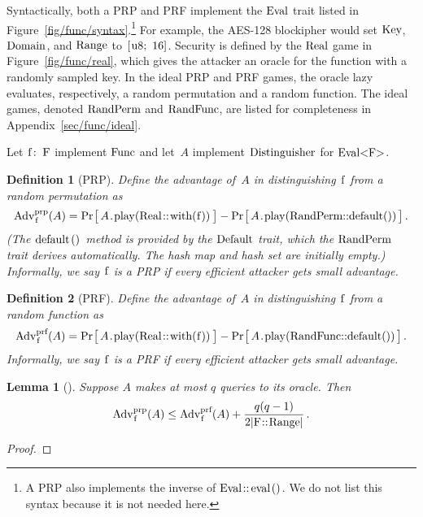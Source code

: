 \documentclass{article}
\newtheorem{definition}{Definition}
\newtheorem{lemma}{Lemma}
\newcommand{\Adv}[1]{\textrm{\textup{Adv}}^{\textup{#1}}}
\newcommand{\Prob}[1]{\Pr\hspace{-1pt}\big[\,#1\,\big]}
\newcommand{\code}[1]{\textrm{\textup{\lstinline{#1}}}}
\begin{document}
Syntactically, both a PRP and PRF implement the $\code{Eval}$ trait listed in
Figure~\ref{fig/func/syntax}.\footnote{A PRP also implements the inverse of
$\code{Eval::eval()}$. We do not list this syntax because it is not needed
here.}
%
For example, the AES-128 blockipher would set $\code{Key}$, $\code{Domain}$,
and $\code{Range}$ to $\code{[u8; 16]}$.
%
Security is defined by the $\code{Real}$ game in Figure~\ref{fig/func/real},
which gives the attacker an oracle for the function with a randomly sampled
key. In the ideal PRP and PRF games, the oracle lazy evaluates, respectively, a
random permutation and a random function.
%
The ideal games, denoted $\code{RandPerm}$ and $\code{RandFunc}$, are listed
for completeness in Appendix~\ref{sec/func/ideal}.

Let $\code{f: F}$ implement \hyperref[fig/func/syntax]{$\code{Func}$} and
let~$A$ implement \hyperref[sec/traits]{$\code{Distinguisher}$} for
\hyperref[sec/traits]{$\code{Eval<F>}$}.

\begin{definition}[PRP]
  Define the advantage of~$A$ in distinguishing $\code{f}$ from a random
  permutation as
  \[
    \Adv{prp}_\code{f}(A) =
      \Prob{A\code{.play(Real::with(f))}} -
      \Prob{A\code{.play(RandPerm::default())}} \,.
  \]
  (The $\code{default()}$ method is provided by the
  \href{https://doc.rust-lang.org/std/default/trait.Default.html}{$\code{Default}$}
  trait, which the \hyperref[sec/traits]{$\code{RandPerm}$} trait derives automatically.
  The hash map and hash set are initially empty.)
  Informally, we say $\code{f}$ is a PRP if every efficient attacker gets small
  advantage.
\end{definition}

\begin{definition}[PRF]
  Define the advantage of~$A$ in distinguishing $\code{f}$ from a random
  function as
  \[
    \Adv{prf}_\code{f}(A) =
      \Prob{A\code{.play(Real::with(f))}} -
      \Prob{A\code{.play(RandFunc::default())}} \,.
  \]
  Informally, we say $\code{f}$ is a PRF if every efficient attacker gets small
  advantage.
\end{definition}

\begin{lemma}[{\cite[Lemma 1]{BR06}}]
  Suppose $A$ makes at most $q$ queries to its oracle. Then
  \[
    \Adv{prp}_\code{f}(A) \leq
      \Adv{prf}_\code{f}(A) +
      \frac{q(q-1)}{2|\code{F::Range}|} \,.
  \]
\end{lemma}
\begin{proof}
  
\end{proof}
\end{document}
